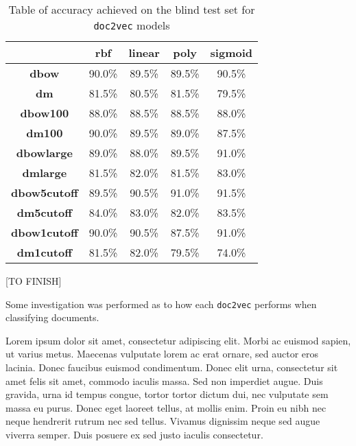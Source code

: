 \documentclass[twocolumn]{article}
\begin{document}
\begin{table*}[]
\centering
\captionsetup{justification=centering}
\caption{Table of accuracy achieved on the blind test set for \texttt{doc2vec} models}
\label{table:doc2vecaccs}
\begin{tabular}{|c|c|c|c|c|}
\hline
                     & \textbf{rbf} & \textbf{linear} & \textbf{poly} & \textbf{sigmoid} \\ \hline
\textbf{dbow}        & 90.0\%       & 89.5\%          & 89.5\%        & 90.5\%                \\ \hline
\textbf{dm}          & 81.5\%       & 80.5\%          & 81.5\%        & 79.5\%               \\ \hline
\textbf{dbow100}     & 88.0\%       & 88.5\%          & 88.5\%        & 88.0\%                \\ \hline
\textbf{dm100}       & 90.0\%       & 89.5\%          & 89.0\%        & 87.5\%                \\ \hline
\textbf{dbowlarge}   & 89.0\%       & 88.0\%          & 89.5\%        & 91.0\%                \\ \hline
\textbf{dmlarge}     & 81.5\%       & 82.0\%          & 81.5\%        & 83.0\%                \\ \hline
\textbf{dbow5cutoff} & 89.5\%       & 90.5\%          & 91.0\%        & 91.5\%                \\ \hline
\textbf{dm5cutoff}   & 84.0\%       & 83.0\%          & 82.0\%        & 83.5\%                \\ \hline
\textbf{dbow1cutoff} & 90.0\%       & 90.5\%          & 87.5\%        & 91.0\%                \\ \hline
\textbf{dm1cutoff}   & 81.5\%       & 82.0\%          & 79.5\%        & 74.0\%                \\ \hline
\end{tabular}
\end{table*}

[TO FINISH]

Some investigation was performed as to how each \texttt{doc2vec} performs when classifying documents.

Lorem ipsum dolor sit amet, consectetur adipiscing elit. Morbi ac euismod sapien, ut varius metus. Maecenas vulputate lorem ac erat ornare, sed auctor eros lacinia. Donec faucibus euismod condimentum. Donec elit urna, consectetur sit amet felis sit amet, commodo iaculis massa. Sed non imperdiet augue. Duis gravida, urna id tempus congue, tortor tortor dictum dui, nec vulputate sem massa eu purus. Donec eget laoreet tellus, at mollis enim. Proin eu nibh nec neque hendrerit rutrum nec sed tellus. Vivamus dignissim neque sed augue viverra semper. Duis posuere ex sed justo iaculis consectetur.
\end{document}
